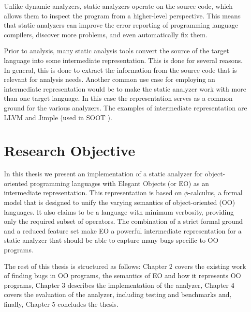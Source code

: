 Unlike dynamic analyzers, static analyzers operate on the source code, which allows them to inspect the program from a higher-level perspective. This means that static analyzers can improve the error reporting of programming language compilers, discover more problems, and  even automatically fix them.

Prior to analysis, many static analysis tools convert the source of the target language into some intermediate representation. This is done for several reasons. In general, this is done to extract the information from the source code that is relevant for analysis needs. Another common use case for employing an intermediate representation would be to
make the static analyzer work with more than one target language. In this case the representation serves as a common ground for the various analyzers. The examples of  intermediate representation are LLVM \cite{llvm} and Jimple \cite{vallee1998jimple} (used in SOOT \cite{vallee2010soot}).

\section{Research Objective}

In this thesis we present an implementation of a static analyzer for object-oriented programming languages with Elegant Objects \cite{eolang} (or EO) as an intermediate representation. This representation is based on $\phi$-calculus, a formal model that is designed to unify the varying semantics of object-oriented (OO) languages. It also claims to be a language with minimum verbosity, providing only the required subset of operators. The combination of a strict formal ground and a reduced feature set make EO a powerful intermediate representation for a static analyzer that should be able to capture many bugs specific to OO programs.

The rest of this thesis is structured as follows: Chapter 2 covers the existing work of finding bugs in OO programs, the semantics of EO and how it represents OO programs, Chapter 3 describes the implementation of the analyzer, Chapter 4 covers the evaluation of the analyzer, including testing and benchmarks and, finally, Chapter 5 concludes the thesis.
